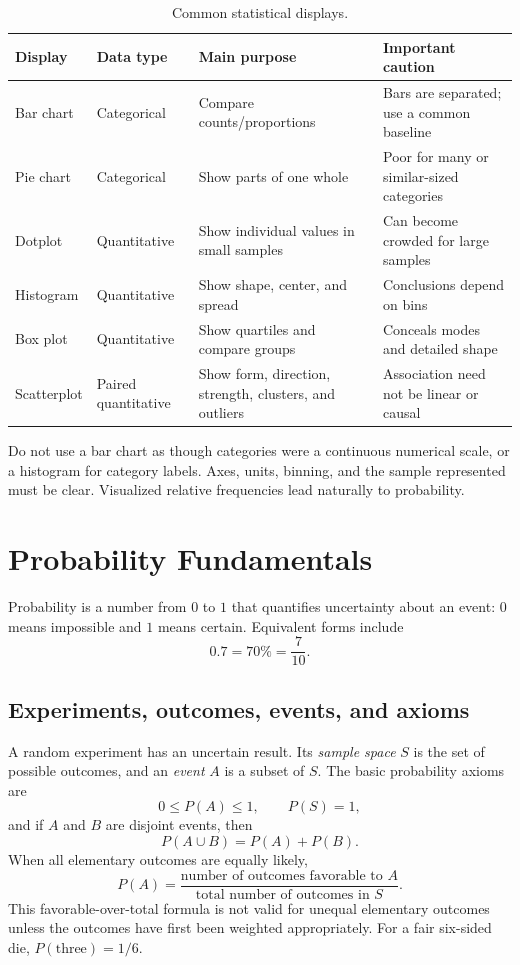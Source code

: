 \documentclass[11pt]{article}
\begin{document}
\begin{table}[ht]
\centering
\caption{Common statistical displays.}\label{tab:graphs}
\begin{tabularx}{\textwidth}{@{}lYYY@{}}
\toprule
Display & Data type & Main purpose & Important caution \\
\midrule
Bar chart & Categorical & Compare counts/proportions & Bars are separated; use a common baseline \\
Pie chart & Categorical & Show parts of one whole & Poor for many or similar-sized categories \\
Dotplot & Quantitative & Show individual values in small samples & Can become crowded for large samples \\
Histogram & Quantitative & Show shape, center, and spread & Conclusions depend on bins \\
Box plot & Quantitative & Show quartiles and compare groups & Conceals modes and detailed shape \\
Scatterplot & Paired quantitative & Show form, direction, strength, clusters, and outliers & Association need not be linear or causal \\
\bottomrule
\end{tabularx}
\end{table}

\begin{keybox}
Do not use a bar chart as though categories were a continuous numerical
scale, or a histogram for category labels.  Axes, units, binning, and the
sample represented must be clear.  Visualized relative frequencies lead
naturally to probability.
\end{keybox}

\section{Probability Fundamentals}\label{sec:probability}
Probability is a number from $0$ to $1$ that quantifies uncertainty about an
event: $0$ means impossible and $1$ means certain.  Equivalent forms include
\[
0.7=70\%=\frac{7}{10}.
\]

\subsection{Experiments, outcomes, events, and axioms}
A random experiment has an uncertain result.  Its \emph{sample space} $S$ is
the set of possible outcomes, and an \emph{event} $A$ is a subset of $S$.
The basic probability axioms are
\begin{equation}\label{eq:prob-axioms}
0\le P(A)\le1,\qquad P(S)=1,
\end{equation}
and if $A$ and $B$ are disjoint events, then
\[
P(A\cup B)=P(A)+P(B).
\]
When all elementary outcomes are equally likely,
\begin{equation}\label{eq:classical-prob}
 P(A)=\frac{\text{number of outcomes favorable to }A}
 {\text{total number of outcomes in }S}.
\end{equation}
This favorable-over-total formula is not valid for unequal elementary
outcomes unless the outcomes have first been weighted appropriately.  For a
fair six-sided die, $P(\text{three})=1/6$.
\end{document}
